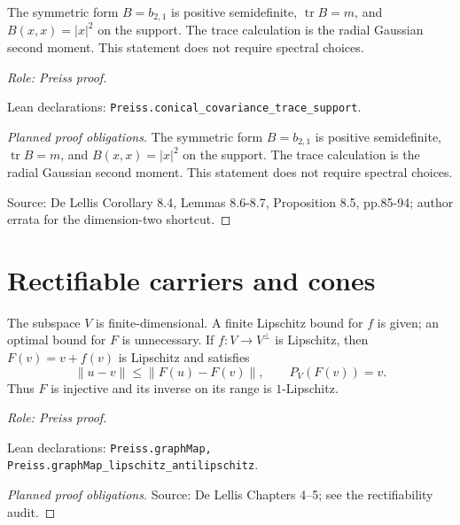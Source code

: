 \begin{lemma}
\label{lem:conical-covariance}





The symmetric form $B=b_{2,1}$ is positive semidefinite,
$\operatorname{tr}B=m$, and $B(x,x)=|x|^2$ on the support.
The trace calculation is the radial Gaussian second moment. This statement
does not require spectral choices.
\par\emph{Role: Preiss proof.}
\par Lean declarations: \texttt{Preiss.conical\_covariance\_trace\_support}.
\end{lemma}
\begin{proof}[Planned proof obligations]

The symmetric form $B=b_{2,1}$ is positive semidefinite,
$\operatorname{tr}B=m$, and $B(x,x)=|x|^2$ on the support.
The trace calculation is the radial Gaussian second moment. This statement
does not require spectral choices.
\par Source: De Lellis Corollary 8.4, Lemmas 8.6-8.7, Proposition 8.5, pp.85-94; author errata for the dimension-two shortcut.
\end{proof}

\section{Rectifiable carriers and cones}

\begin{lemma}
\label{lem:graph-parametrization}








The subspace \(V\) is finite-dimensional. A finite Lipschitz bound for \(f\) is given; an optimal bound for \(F\) is unnecessary.
If \(f:V\to V^\perp\) is Lipschitz, then \(F(v)=v+f(v)\) is Lipschitz and satisfies
\[
 \|u-v\|\leq\|F(u)-F(v)\|,\qquad P_V(F(v))=v.
\]
Thus \(F\) is injective and its inverse on its range is \(1\)-Lipschitz.
\par\emph{Role: Preiss proof.}
\par Lean declarations: \texttt{Preiss.graphMap, Preiss.graphMap\_lipschitz\_antilipschitz}.
\end{lemma}
\begin{proof}[Planned proof obligations]
\par Source: De Lellis Chapters 4--5; see the rectifiability audit.
\end{proof}

